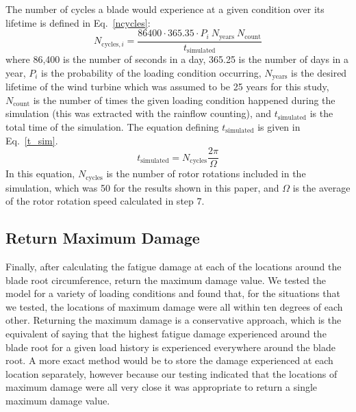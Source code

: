 \documentclass[11pt,letterpaper]{article}
\begin{document}
The number of cycles a blade would experience at a given condition over its lifetime is defined in Eq.~\ref{ncycles}:
% 
\begin{equation}
    N_{\text{cycles},i} = \frac{86400 \cdot 365.35 \cdot P_i ~ N_{\text{years}}~ N_{\text{count}}}{t_{\text{simulated}}}
    \label{ncycles}
\end{equation}
% 
where 86,400 is the number of seconds in a day, 365.25 is the number of days in a year, $P_i$ is the probability of the loading condition occurring, $N_{\text{years}}$ is the desired lifetime of the wind turbine which was assumed to be 25 years for this study, $N_{\text{count}}$ is the number of times the given loading condition happened during the simulation (this was extracted with the rainflow counting), and $t_{\text{simulated}}$ is the total time of the simulation. The equation defining $t_{\text{simulated}}$ is given in Eq.~\ref{t_sim}.
% 
\begin{equation}
    t_{\text{simulated}} = N_{\text{cycles}} \frac{2\pi}{\Omega}
    \label{t_sim}
\end{equation}
% 
In this equation, $N_{\text{cycles}}$ is the number of rotor rotations included in the simulation, which was 50 for the results shown in this paper, and $\Omega$ is the average of the rotor rotation speed calculated in step 7. 
                


\subsection{Return Maximum Damage}

Finally, after calculating the fatigue damage at each of the locations around the blade root circumference, return the maximum damage value. 
We tested the model for a variety of loading conditions and found that, for the situations that we tested, the locations of maximum damage were all within ten degrees of each other.
Returning the maximum damage is a conservative approach, which is the equivalent of saying that the highest fatigue damage experienced around the blade root for a given load history is experienced everywhere around the blade root. 
A more exact method would be to store the damage experienced at each location separately, however because our testing indicated that the locations of maximum damage were all very close it was appropriate to return a single maximum damage value.
\end{document}
